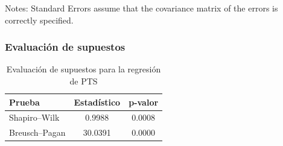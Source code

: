 Notes: \newline
 [1] Standard Errors assume that the covariance matrix of the errors is correctly specified.
\subsubsection{Evaluación de supuestos}
\begin{table}[H]
\centering
\begin{tabular}{lcc}
\toprule
Prueba & Estadístico & p-valor \\
\midrule
Shapiro--Wilk & 0.9988 & 0.0008 \\
Breusch--Pagan & 30.0391 & 0.0000 \\
\bottomrule
\end{tabular}
\caption{Evaluación de supuestos para la regresión de PTS}
\end{table}
